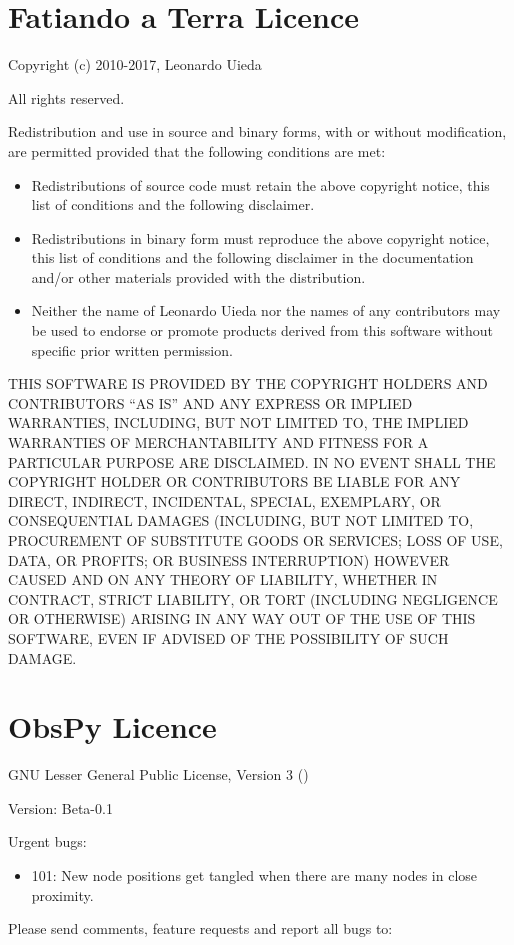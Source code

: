 \documentclass[a4paper,12pt,english]{sphinxmanual}
\begin{document}
\section{Fatiando a Terra Licence}
\label{\detokenize{licence:fatiando-a-terra-licence}}
Copyright (c) 2010-2017, Leonardo Uieda

All rights reserved.

Redistribution and use in source and binary forms, with or without modification,
are permitted provided that the following conditions are met:
\begin{itemize}
\item {} 
Redistributions of source code must retain the above copyright notice,
this list of conditions and the following disclaimer.

\item {} 
Redistributions in binary form must reproduce the above copyright notice,
this list of conditions and the following disclaimer in the documentation
and/or other materials provided with the distribution.

\item {} 
Neither the name of Leonardo Uieda nor the names of any contributors
may be used to endorse or promote products derived from this software
without specific prior written permission.

\end{itemize}

THIS SOFTWARE IS PROVIDED BY THE COPYRIGHT HOLDERS AND CONTRIBUTORS “AS IS” AND
ANY EXPRESS OR IMPLIED WARRANTIES, INCLUDING, BUT NOT LIMITED TO, THE IMPLIED
WARRANTIES OF MERCHANTABILITY AND FITNESS FOR A PARTICULAR PURPOSE ARE
DISCLAIMED. IN NO EVENT SHALL THE COPYRIGHT HOLDER OR CONTRIBUTORS BE LIABLE FOR
ANY DIRECT, INDIRECT, INCIDENTAL, SPECIAL, EXEMPLARY, OR CONSEQUENTIAL DAMAGES
(INCLUDING, BUT NOT LIMITED TO, PROCUREMENT OF SUBSTITUTE GOODS OR SERVICES;
LOSS OF USE, DATA, OR PROFITS; OR BUSINESS INTERRUPTION) HOWEVER CAUSED AND ON
ANY THEORY OF LIABILITY, WHETHER IN CONTRACT, STRICT LIABILITY, OR TORT
(INCLUDING NEGLIGENCE OR OTHERWISE) ARISING IN ANY WAY OUT OF THE USE OF THIS
SOFTWARE, EVEN IF ADVISED OF THE POSSIBILITY OF SUCH DAMAGE.


\section{ObsPy Licence}
\label{\detokenize{licence:obspy-licence}}
GNU Lesser General Public License, Version 3 ()



Version: Beta-0.1

Urgent bugs:
\begin{itemize}
\item {} 
101: New node positions get tangled when there are many nodes in close proximity.

\end{itemize}

Please send comments, feature requests and report all bugs to: 



\renewcommand{\indexname}{Index}
\printindex
\end{document}
